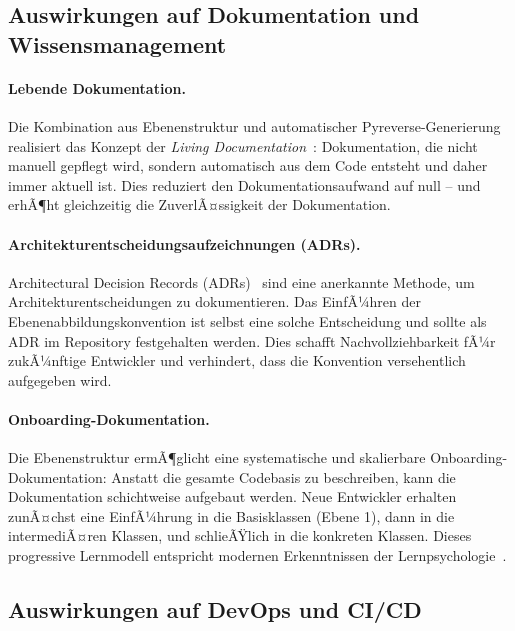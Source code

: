 ﻿\documentclass[a4paper,12pt]{article}
\begin{document}
\subsection{Auswirkungen auf Dokumentation und Wissensmanagement}

\paragraph{Lebende Dokumentation.}
Die Kombination aus Ebenenstruktur und automatischer Pyreverse-Generierung
realisiert das Konzept der \textit{Living Documentation}~\cite{martraire2019}:
Dokumentation, die nicht manuell gepflegt wird, sondern automatisch aus dem
Code entsteht und daher immer aktuell ist. Dies reduziert den Dokumentationsaufwand
auf null -- und erhÃ¶ht gleichzeitig die ZuverlÃ¤ssigkeit der Dokumentation.

\paragraph{Architekturentscheidungsaufzeichnungen (ADRs).}
Architectural Decision Records (ADRs)~\cite{nygard2011} sind eine anerkannte
Methode, um Architekturentscheidungen zu dokumentieren. Das EinfÃ¼hren der
Ebenenabbildungskonvention ist selbst eine solche Entscheidung und sollte als ADR
im Repository festgehalten werden. Dies schafft Nachvollziehbarkeit fÃ¼r zukÃ¼nftige
Entwickler und verhindert, dass die Konvention versehentlich aufgegeben wird.

\paragraph{Onboarding-Dokumentation.}
Die Ebenenstruktur ermÃ¶glicht eine systematische und skalierbare
Onboarding-Dokumentation: Anstatt die gesamte Codebasis zu beschreiben, kann
die Dokumentation schichtweise aufgebaut werden. Neue Entwickler erhalten zunÃ¤chst
eine EinfÃ¼hrung in die Basisklassen (Ebene 1), dann in die intermediÃ¤ren Klassen,
und schlieÃŸlich in die konkreten Klassen. Dieses progressive Lernmodell
entspricht modernen Erkenntnissen der Lernpsychologie~\cite{vygotsky1978}.

\subsection{Auswirkungen auf DevOps und CI/CD}
\end{document}

